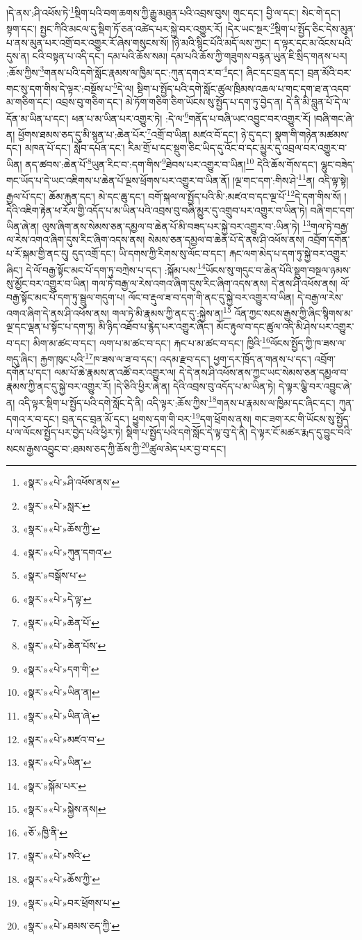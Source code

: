 །དེ་ནས་:ཤི་འཕོས་ཏེ་\footnote{«སྣར་»«པེ་»ཤི་འཕོས་ནས་}སྡིག་པའི་བག་ཆགས་ཀྱི་རྒྱུ་མཐུན་པའི་འབྲས་བུས། གུང་དང་། བྱི་ལ་དང་། སེང་གེ་དང་། སྟག་དང་། སྤྱང་ཀིའི་མངལ་དུ་སྡིག་ཏོ་ཅན་འཚེད་པར་སྐྱེ་བར་འགྱུར་རོ། །དེར་ཡང་སྔར་\footnote{«སྣར་»«པེ་»སླར་}སྡིག་པ་སྤྱོད་ཅིང་དེས་མུན་པ་ནས་མུན་པར་འགྲོ་བར་འགྱུར་རོ་ཞེས་གསུངས་སོ། །ཉི་མའི་སྙིང་པོའི་མདོ་ལས་ཀྱང་། ད་ལྟར་དང་མ་འོངས་པའི་དུས་ན། ངའི་བསྟན་པ་འདི་དང་། དམ་པའི་ཆོས་སམ། དམ་པའི་ཆོས་ཀྱི་གཟུགས་བརྙན་ཡུན་ཇི་སྲིད་གནས་པར། :ཆོས་ཀྱིས་\footnote{«སྣར་»«པེ་»ཆོས་ཀྱི་}གནས་པའི་དགེ་སློང་རྣམས་ལ་ཁྱིམ་དང་:ཀུན་དགའ་ར་བ་\footnote{«སྣར་»«པེ་»ཀུན་དགའ་}དང་། ཞིང་དང་བྲན་དང་། བྲན་མོའི་བར་གང་སུ་དག་གིས་དེ་ལྟར་:བསྔོས་པ་\footnote{«སྣར་»བསྒོས་པ་}དེ་ལ། སྡིག་པ་སྤྱོད་པའི་དགེ་སློང་ཚུལ་ཁྲིམས་འཆལ་པ་གང་དག་ཐ་ན་འདབ་མ་གཅིག་དང་། འབྲས་བུ་གཅིག་དང་། མེ་ཏོག་གཅིག་ཅིག་ཡོངས་སུ་སྤྱོད་པ་དག་ཏུ་བྱེད་ན། དེ་ནི་མི་བླུན་པོ་དེ་ལ་དོན་མ་ཡིན་པ་དང་། ཕན་པ་མ་ཡིན་པར་འགྱུར་ཏེ། :དེ་ལ་\footnote{«སྣར་»«པེ་»དེ་ལྟ་}གནོད་པ་བཞི་ཡང་འབྱུང་བར་འགྱུར་རོ། །བཞི་གང་ཞེ་ན། ཕྱོགས་ཐམས་ཅད་དུ་མི་སྙན་པ་:ཆེན་པོར་\footnote{«སྣར་»«པེ་»ཆེན་པོ་}འགྲོ་བ་ཡིན། མཛའ་བོ་དང་། ཉེ་དུ་དང་། སྣག་གི་གཉེན་མཚམས་དང་། མཁན་པོ་དང་། སློབ་དཔོན་དང་། རིམ་གྲོ་པ་དང་སྡུག་ཅིང་ཡིད་དུ་འོང་བ་དང་མྱུར་དུ་འབྲལ་བར་འགྱུར་བ་ཡིན། ནད་ཚབས་:ཆེན་པོ་\footnote{«སྣར་»«པེ་»ཆེན་པོས་}ཡུན་རིང་བ་:དག་གིས་\footnote{«སྣར་»«པེ་»དག་གི་}ཐེབས་པར་འགྱུར་བ་ཡིན།\footnote{«སྣར་»«པེ་»ཡིན་ན།} དེའི་ཆོས་གོས་དང་། ལྷུང་བཟེད་གང་ཡོད་པ་དེ་ཡང་འཇིགས་པ་ཆེན་པོ་ལྔས་ཕྲོགས་པར་འགྱུར་བ་ཡིན་ནོ། །ལྔ་གང་དག་:གིས་ཤེ་\footnote{«སྣར་»«པེ་»ཡིན་ཞེ་}ན། འདི་ལྟ་སྟེ། རྒྱལ་པོ་དང་། ཆོམ་རྐུན་དང་། མེ་དང་ཆུ་དང་། བགོ་སྐལ་ལ་སྤྱོད་པའི་མི་:མཛའ་བ་དང་ལྔ་པོ་\footnote{«སྣར་»«པེ་»མཛའ་བ་}དེ་དག་གིས་སོ། །དེའི་འཇིག་རྟེན་ཕ་རོལ་གྱི་འདོད་པ་མ་ཡིན་པའི་འབྲས་བུ་བཞི་མྱུར་དུ་འགྲུབ་པར་འགྱུར་བ་ཡིན་ཏེ། བཞི་གང་དག་ཡིན་ཞེ་ན། ལུས་ཞིག་ནས་སེམས་ཅན་དམྱལ་བ་ཆེན་པོ་མི་བཟད་པར་སྐྱེ་བར་འགྱུར་བ་:ཡིན་ཏེ། \footnote{«སྣར་»«པེ་»ཡིན་}གལ་ཏེ་བརྒྱ་ལ་རེས་འགའ་ཞིག་དུས་རིང་ཞིག་འདས་ནས། སེམས་ཅན་དམྱལ་བ་ཆེན་པོ་དེ་ནས་ཤི་འཕོས་ནས། འབྲོག་དགོན་པ་རོ་སྐམ་གྱི་ནང་དུ། དུད་འགྲོ་དང་། ཡི་དགས་ཀྱི་རིགས་སུ་ལོང་བ་དང་། རྐང་ལག་མེད་པ་དག་ཏུ་སྐྱེ་བར་འགྱུར་ཞིང་། དེ་ལོ་བརྒྱ་སྟོང་མང་པོ་དག་ཏུ་བཀྲེས་པ་དང་། :སྐོམ་པས་\footnote{«སྣར་»སྐོམ་པར་}ཡོངས་སུ་གདུང་བ་ཆེན་པོའི་སྡུག་བསྔལ་ཉམས་སུ་མྱོང་བར་འགྱུར་བ་ཡིན། གལ་ཏེ་བརྒྱ་ལ་རེས་འགའ་ཞིག་དུས་རིང་ཞིག་འདས་ནས། དེ་ནས་ཤི་འཕོས་ནས། ལོ་བརྒྱ་སྟོང་མང་པོ་དག་ཏུ་སྦྲུལ་གདུག་པ། ལོང་བ་རྡུལ་ཟ་བ་དག་གི་ནང་དུ་སྐྱེ་བར་འགྱུར་བ་ཡིན། དེ་བརྒྱ་ལ་རེས་འགའ་ཞིག་དེ་ནས་ཤི་འཕོས་ནས། གལ་ཏེ་མི་རྣམས་ཀྱི་ནང་དུ་:སྐྱེས་ན།\footnote{«སྣར་»«པེ་»སྐྱེས་ནས།} འོན་ཀྱང་སངས་རྒྱས་ཀྱི་ཞིང་སྙིགས་མ་ལྔ་དང་ལྡན་པ་སྟོང་པ་དག་ཏུ། མི་ཉིད་འཐོབ་པ་རྙེད་པར་འགྱུར་ཞིང་། མོང་རྟུལ་བ་དང་ཚུལ་འདི་མི་ཤེས་པར་འགྱུར་བ་དང་། མིག་མ་ཚང་བ་དང་། ལག་པ་མ་ཚང་བ་དང་། རྐང་པ་མ་ཚང་བ་དང་། ཁྱིའི་\footnote{«ཅོ་»ཁྱི་ནི་}ལོངས་སྤྱོད་ཀྱི་ཁ་ཟས་ལ་གདུ་ཞིང་། རྐྱག་ཁུང་པའི་\footnote{«སྣར་»«པེ་»སའི་}ཁ་ཟས་ལ་ཟ་བ་དང་། འདམ་རྫབ་དང་། ཕྱག་དར་ཁྲོད་ན་གནས་པ་དང་། འབྲོག་དགོན་པ་དང་། ལམ་པོ་ཆེ་རྣམས་ན་འཚོ་བར་འགྱུར་ལ། དེ་དེ་ནས་ཤི་འཕོས་ནས་ཀྱང་ཡང་སེམས་ཅན་དམྱལ་བ་རྣམས་ཀྱི་ནང་དུ་སྐྱེ་བར་འགྱུར་རོ། །དེ་ཅིའི་ཕྱིར་ཞེ་ན། དེའི་འབྲས་བུ་འདོད་པ་མ་ཡིན་ཏེ། དེ་ལྟར་ལྕི་བར་འབྱུང་ཞེ་ན། འདི་ལྟར་སྡིག་པ་སྤྱོད་པའི་དགེ་སློང་དེ་ནི། འདི་ལྟར་:ཆོས་ཀྱིས་\footnote{«སྣར་»«པེ་»ཆོས་ཀྱི་}གནས་པ་རྣམས་ལ་ཁྱིམ་དང་ཞིང་དང་། ཀུན་དགའ་ར་བ་དང་། བྲན་དང་བྲན་མོ་དང་། ཕྱུགས་དག་གི་བར་\footnote{«སྣར་»«པེ་»བར་ཕྲོགས་པ་}དག་ཕྲོགས་ནས། གང་ཟག་རང་གི་ཡོངས་སུ་སྤྱོད་པ་ལ་ལོངས་སྤྱོད་པར་བྱེད་པའི་ཕྱིར་ཏེ། སྡིག་པ་སྤྱོད་པའི་དགེ་སློང་དེ་ལྟ་བུ་དེ་ནི། དེ་ལྟར་ངོ་མཚར་རྨད་དུ་བྱུང་བའི་སངས་རྒྱས་འབྱུང་བ་:ཐམས་ཅད་ཀྱི་ཆོས་ཀྱི་\footnote{«སྣར་»«པེ་»ཐམས་ཅད་ཀྱི་}ཚུལ་མེད་པར་བྱ་བ་དང་། 